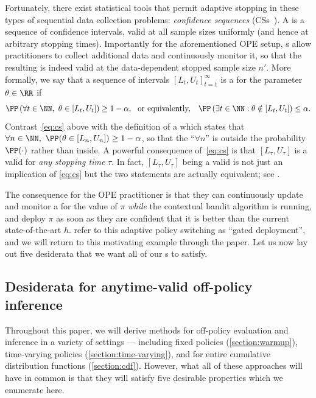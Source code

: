 Fortunately, there exist statistical tools that permit adaptive stopping in these types of sequential data collection problems: \emph{confidence sequences} (CSs~\cite{darling1967confidence,lai1976confidence}). A \cs{} is a sequence of confidence intervals, valid at all sample sizes uniformly (and hence at arbitrary stopping times). Importantly for the aforementioned OPE setup, \cs{}s allow practitioners to collect additional data and continuously monitor it, so that the resulting \ci{} is indeed valid at the data-dependent stopped sample size $n'$. More formally, we say that a sequence of intervals $[L_t, U_t]_{t=1}^\infty$ is a \cs{} for the parameter $\theta \in \RR$ if
\begin{equation}\label{eq:cs}
  \PP \left ( \forall t \in \NN,\ \theta \in [L_t, U_t] \right ) \geq 1-\alpha,
  ~~\text{or equivalently,}~~~ \PP \left ( \exists t \in \NN : \theta \notin [L_t, U_t] \right ) \leq \alpha.
\end{equation}
Contrast~\eqref{eq:cs} above with the definition of a \ci{} which states that $\forall n \in \NN,\ \PP(\theta \in [L_n, U_n]) \geq 1-\alpha$, so that the ``$\forall n$'' is outside the probability $\PP(\cdot)$ rather than inside. A powerful consequence of~\eqref{eq:cs} is that $[L_\tau, U_\tau]$ is a valid \ci{} for \emph{any stopping time} $\tau$. In fact, $[L_\tau, U_\tau]$ being a valid \ci{} is not just an implication of \eqref{eq:cs} but the two statements are actually equivalent; see \citet[Lemma 3]{howard2018uniform}. 

The consequence for the OPE practitioner is that they can continuously update and monitor a \cs{} for the value of $\pi$ \emph{while} the contextual bandit algorithm is running, and deploy $\pi$ as soon as they are confident that it is better than the current state-of-the-art $h$. \citet{karampatziakis2021off} refer to this adaptive policy switching as ``gated deployment'', and we will return to this motivating example through the paper. Let us now lay out five desiderata that we want all of our \cs{}s to satisfy.

\subsection{Desiderata for anytime-valid off-policy inference}\label{section:desiderata}
Throughout this paper, we will derive methods for off-policy evaluation and inference in a variety of settings --- including fixed policies (\cref{section:warmup}), time-varying policies (\cref{section:time-varying}), and for entire cumulative distribution functions (\cref{section:cdf}). However, what all of these approaches will have in common is that they will satisfy five desirable properties which we enumerate here.

